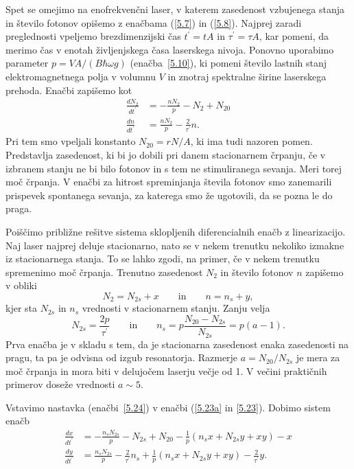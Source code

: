 Spet se omejimo na enofrekvenčni laser, v katerem zasedenost vzbujenega stanja
in število fotonov opišemo z enačbama (\ref{5.7})
in (\ref{5.8}). Najprej zaradi preglednosti vpeljemo
brezdimenzijski čas $t^{\prime}=t A$ in $\tau^{\prime}=\tau A$, kar pomeni, da merimo 
čas v enotah življenjskega časa laserskega nivoja. Ponovno uporabimo parameter
$p=VA/(B\hbar\omega g)$ (enačba~\ref{5.10}), ki pomeni število lastnih stanj 
elektromagnetnega polja v volumnu $V$ in znotraj spektralne širine laserskega prehoda. 
Enačbi zapišemo kot
\begin{align}  
\frac{d N_2}{d t^{\prime}}&=-\frac{nN_2}{p}-N_2+N_{20} \label{5.23a} \\
\frac{d n}{d t^{\prime}}& =  \frac{nN_2}{p}-\frac{2}{\tau^{\prime}}n.
\label{5.23}
\end{align}
Pri tem smo vpeljali konstanto $N_{20}= rN/A$, ki ima tudi nazoren pomen.
Predstavlja zasedenost, ki bi jo dobili pri danem stacionarnem črpanju, če v
izbranem stanju ne bi bilo fotonov in s tem ne stimuliranega sevanja. Meri torej 
moč črpanja. V enačbi za hitrost spreminjanja števila fotonov
smo zanemarili prispevek spontanega sevanja, za katerega smo že ugotovili,
da se pozna le do praga.

Poiščimo približne rešitve sistema sklopljenih diferencialnih enačb z 
linearizacijo. Naj laser najprej deluje stacionarno, nato se v nekem trenutku  
nekoliko izmakne iz stacionarnega stanja. To se lahko zgodi, na primer, če v nekem 
trenutku spremenimo moč črpanja. Trenutno zasedenost $N_2$ in število fotonov $n$
zapišemo v obliki 
\begin{equation}  
N_2= N_{2s}+x \qquad \mathrm{in} \qquad n=n_s+y,
\label{5.24}
\end{equation}
kjer sta $N_{2s}$ in $n_s$ vrednosti v stacionarnem stanju. Zanju velja 
\begin{equation}  
N_{2s}=\frac{2p}{\tau^{\prime}}\qquad \mathrm{in}\qquad  
n_s=p\frac{N_{20}-N_{2s}}{N_{2s}}=p(a-1).
\label{5.26}
\end{equation}
Prva enačba je v skladu s tem, da je stacionarna zasedenost 
enaka zasedenosti na pragu, ta pa je odvisna od izgub resonatorja. 
Razmerje $a=N_{20}/N_{2s}$ je mera za moč črpanja in
mora biti v delujočem laserju večje od 1. V večini praktičnih primerov
doseže vrednosti $a \sim 5$.

Vstavimo nastavka (enačbi~\ref{5.24}) v enačbi (\ref{5.23a} in \ref{5.23}). 
Dobimo sistem enačb
\begin{align}  
\frac{d x}{d t^{\prime}} &=-\frac{n_sN_{2s}}{p}-N_{2s}+N_{20}- \frac{1}{p}
(n_sx+N_{2s}y+xy)-x \\
\frac{d y}{d t^{\prime}} &= \frac{n_sN_{2s}}{p}-\frac{2}{\tau^{\prime}}n_s
+ \frac{1}{p}(n_s x+N_{2s} y+xy)-\frac{2}{\tau^{\prime}}y.
\label{5.27}
\end{align}

